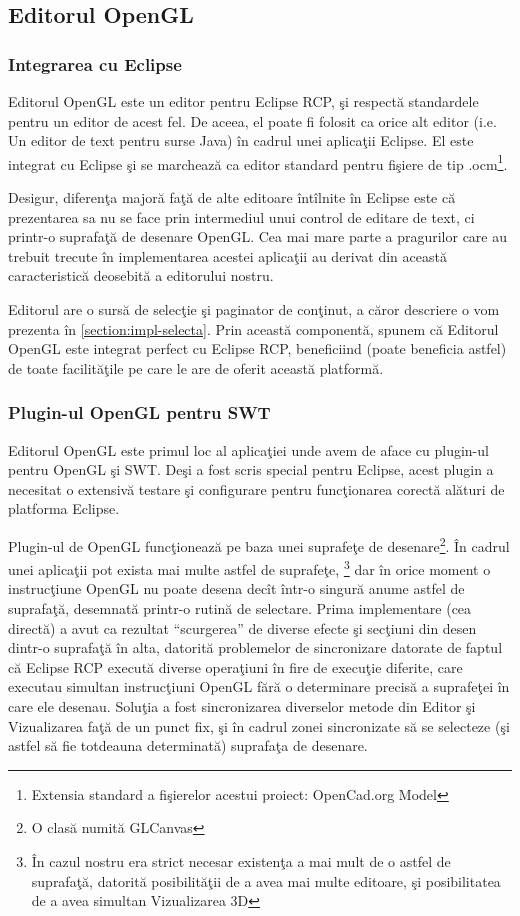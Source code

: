 \subsection{Editorul OpenGL}
\label{section:impl-editor}

\subsubsection{Integrarea cu Eclipse}
Editorul OpenGL este un editor pentru Eclipse RCP, şi respectă standardele
pentru un editor de acest fel. De aceea, el poate fi folosit ca orice alt editor
(i.e. Un editor de text pentru surse Java) în cadrul unei aplicaţii Eclipse. El
este integrat cu Eclipse şi se marchează ca editor standard pentru fişiere de
tip .ocm\footnote{Extensia standard a fişierelor acestui proiect: OpenCad.org
Model}.

Desigur, diferenţa majoră faţă de alte editoare întîlnite în Eclipse este că
prezentarea sa nu se face prin intermediul unui control de editare de text, ci
printr-o suprafaţă de desenare OpenGL. Cea mai mare parte a pragurilor care au
trebuit trecute în implementarea acestei aplicaţii au derivat din această
caracteristică deosebită a editorului nostru.

Editorul are o sursă de selecţie şi paginator de conţinut, a căror descriere o
vom prezenta în \ref{section:impl-selecta}. Prin această componentă, spunem că
Editorul OpenGL este integrat perfect cu Eclipse RCP, beneficiind (poate
beneficia astfel) de toate facilităţile pe care le are de oferit această
platformă.

\subsubsection{Plugin-ul OpenGL pentru SWT}
Editorul OpenGL este primul loc al aplicaţiei unde avem de aface cu plugin-ul
pentru OpenGL şi SWT. Deşi a fost scris special pentru Eclipse, acest plugin a
necesitat o extensivă testare şi configurare pentru funcţionarea corectă alături
de platforma Eclipse.

Plugin-ul de OpenGL funcţionează pe baza unei suprafeţe de desenare\footnote{O 
clasă numită GLCanvas}. În cadrul unei aplicaţii pot exista mai multe astfel de 
suprafeţe, \footnote{În cazul nostru era strict necesar existenţa a mai mult de 
o astfel de suprafaţă, datorită posibilităţii de a avea mai multe editoare, şi 
posibilitatea de a avea simultan Vizualizarea 3D} dar în orice moment o 
instrucţiune OpenGL nu poate desena decît într-o singură anume astfel de 
suprafaţă, desemnată printr-o rutină de selectare. Prima implementare (cea 
directă) a avut ca rezultat ``scurgerea'' de diverse efecte şi secţiuni din 
desen dintr-o suprafaţă în alta, datorită problemelor de sincronizare datorate 
de faptul că Eclipse RCP execută diverse operaţiuni în fire de execuţie 
diferite, care executau simultan instrucţiuni OpenGL fără o determinare precisă 
a suprafeţei în care ele desenau. Soluţia a fost sincronizarea diverselor 
metode din Editor şi Vizualizarea faţă de un punct fix, şi în cadrul zonei 
sincronizate să se selecteze (şi astfel să fie totdeauna determinată) suprafaţa 
de desenare.

